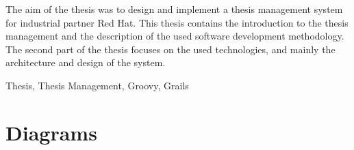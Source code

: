 \documentclass[11pt,oneside]{fithesis2}
\begin{document}
\FrontMatter
\ThesisTitlePage

\begin{ThesisDeclaration}		
\DeclarationText
\end{ThesisDeclaration}

\begin{ThesisAbstract}
The aim of the thesis was to design and implement a thesis management system for industrial partner Red Hat. This thesis contains the introduction to the thesis management and the description of the used software development methodology. The second part of the thesis focuses on the used technologies, and mainly the architecture and design of the system.
\end{ThesisAbstract}

\begin{ThesisKeyWords}
    Thesis, Thesis Management, Groovy, Grails
\end{ThesisKeyWords}

\MainMatter

\tableofcontents












\appendix

\chapter{Diagrams}
\end{document}
